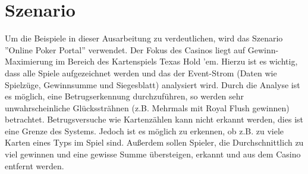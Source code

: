 \chapter{Szenario}
\label{Szenario}
Um die Beispiele in dieser Ausarbeitung zu verdeutlichen, wird das Szenario ''Online Poker Portal'' verwendet. Der Fokus des Casinos liegt auf Gewinn-Maximierung im Bereich des Kartenspiels Texas Hold 'em.
\absatz
Hierzu ist es wichtig, dass alle Spiele aufgezeichnet werden und das der Event-Strom (Daten wie Spielzüge, Gewinnsumme und Siegesblatt) analysiert wird. 
Durch die Analyse ist es möglich, eine Betrugserkennung durchzuführen, so werden sehr unwahrscheinliche Glückssträhnen (z.B. Mehrmals mit Royal Flush gewinnen) betrachtet.
Betrugsversuche wie Kartenzählen kann nicht erkannt werden, dies ist eine Grenze des Systems. Jedoch ist es möglich zu erkennen, ob z.B. zu viele Karten eines Typs im Spiel sind.
Außerdem sollen Spieler, die Durchschnittlich zu viel gewinnen und eine gewisse Summe übersteigen, erkannt und aus dem Casino entfernt werden.